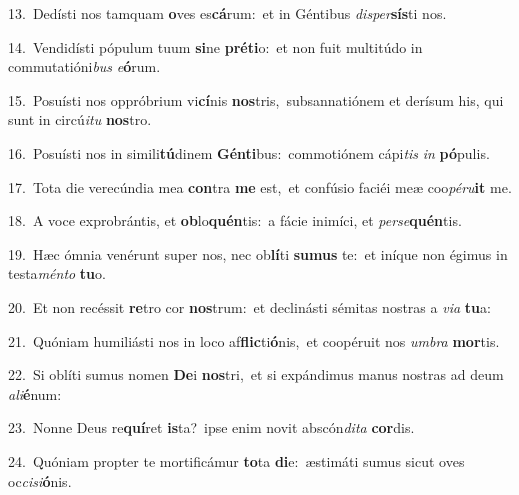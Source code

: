 {\numbfont\textcolor{\numbcolor}{13.}}~Dedísti nos tamquam \textbf{o}\-ves es\-\textbf{cá}\-rum:~\star et in Géntibus \textit{di}\-\textit{sper}\textbf{sís}ti nos.\par
{\numbfont\textcolor{\numbcolor}{14.}}~Vendidísti pópulum tuum \textbf{si}\-ne \textbf{pré}\-\textbf{ti}o:~\star et non fuit multitúdo in commutatióni\textit{bus} \textit{e}\-\textbf{ó}rum.\par
{\numbfont\textcolor{\numbcolor}{15.}}~Posuísti nos oppróbrium vi\-\textbf{cí}\-nis \textbf{nos}\-tris,~\star subsannatiónem et derísum his, qui sunt in circú\-\textit{i}\-\textit{tu} \textbf{nos}\-tro.\par
{\numbfont\textcolor{\numbcolor}{16.}}~Posuísti nos in simili\-\textbf{tú}\-dinem \textbf{Gén}\-\textbf{ti}bus:~\star commotiónem cápi\textit{tis} \textit{in} \textbf{pó}\-pulis.\par
{\numbfont\textcolor{\numbcolor}{17.}}~Tota die verecúndia mea \textbf{con}\-tra \textbf{me} est,~\star et confúsio faciéi meæ coo\-\textit{pé}\-\textit{ru}\textbf{it} me.\par
{\numbfont\textcolor{\numbcolor}{18.}}~A voce exprobrántis, et \textbf{ob}\-lo\-\textbf{quén}\-tis:~\star a fácie inimíci, et \textit{per}\-\textit{se}\textbf{quén}tis.\par
{\numbfont\textcolor{\numbcolor}{19.}}~Hæc ómnia venérunt super nos, nec ob\-\textbf{lí}\-ti \textbf{su}\-\textbf{mus} te:~\star et iníque non égimus in testa\-\textit{mén}\-\textit{to} \textbf{tu}\-o.\par
{\numbfont\textcolor{\numbcolor}{20.}}~Et non recéssit \textbf{re}\-tro cor \textbf{nos}\-trum:~\star et declinásti sémitas nostras a \textit{vi}\-\textit{a} \textbf{tu}\-a:\par
{\numbfont\textcolor{\numbcolor}{21.}}~Quóniam humiliásti nos in loco af\-\textbf{flic}\-ti\-\textbf{ó}\-nis,~\star et coopéruit nos \textit{um}\-\textit{bra} \textbf{mor}\-tis.\par
{\numbfont\textcolor{\numbcolor}{22.}}~Si oblíti sumus nomen \textbf{De}\-i \textbf{nos}\-tri,~\star et si expándimus manus nostras ad deum \textit{a}\-\textit{li}\textbf{é}num:\par
{\numbfont\textcolor{\numbcolor}{23.}}~Nonne Deus re\-\textbf{quí}\-ret \textbf{is}\-ta?~\star ipse enim novit abscón\-\textit{di}\-\textit{ta} \textbf{cor}\-dis.\par
{\numbfont\textcolor{\numbcolor}{24.}}~Quóniam propter te mortificámur \textbf{to}\-ta \textbf{di}\-e:~\star æstimáti sumus sicut oves oc\-\textit{ci}\-\textit{si}\textbf{ó}nis.\par
